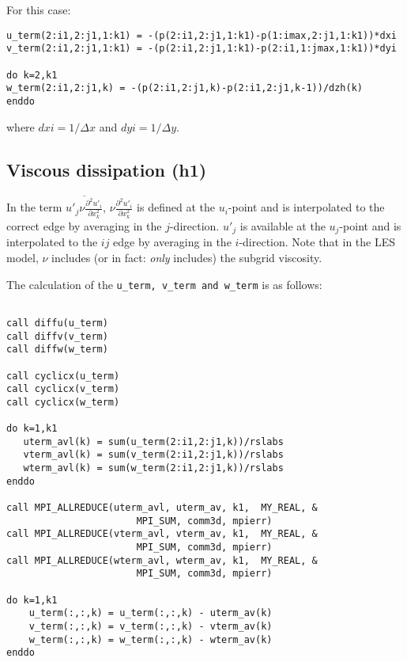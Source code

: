 \documentclass[10pt]{article}
\begin{document}
For this case:

\begin{verbatim}
u_term(2:i1,2:j1,1:k1) = -(p(2:i1,2:j1,1:k1)-p(1:imax,2:j1,1:k1))*dxi
v_term(2:i1,2:j1,1:k1) = -(p(2:i1,2:j1,1:k1)-p(2:i1,1:jmax,1:k1))*dyi

do k=2,k1
w_term(2:i1,2:j1,k) = -(p(2:i1,2:j1,k)-p(2:i1,2:j1,k-1))/dzh(k) 
enddo
\end{verbatim}

\noindent where $dxi=1/\Delta x$ and $dyi=1/\Delta y$.

\subsection{Viscous dissipation (h1)}
In the term $\overline{u'_j \nu \frac{\partial^2 u'_i}{\partial x^2_k}}$, $\nu \frac{\partial^2 u'_i}{\partial x^2_k}$ is 
defined at the $u_i$-point  and is interpolated to the correct edge by averaging in the $j$-direction. $u'_j$ 
is available at the $u_j$-point and is interpolated to the $ij$ edge by averaging in the $i$-direction.
Note that in the LES model, $\nu$ includes (or in fact: \emph{only} includes) the subgrid viscosity.

The calculation of the \verb=u_term, v_term and w_term= is as follows:

\begin{verbatim}

call diffu(u_term)
call diffv(v_term)
call diffw(w_term)

call cyclicx(u_term)
call cyclicx(v_term)
call cyclicx(w_term)

do k=1,k1
   uterm_avl(k) = sum(u_term(2:i1,2:j1,k))/rslabs
   vterm_avl(k) = sum(v_term(2:i1,2:j1,k))/rslabs
   wterm_avl(k) = sum(w_term(2:i1,2:j1,k))/rslabs
enddo

call MPI_ALLREDUCE(uterm_avl, uterm_av, k1,  MY_REAL, &
                       MPI_SUM, comm3d, mpierr)
call MPI_ALLREDUCE(vterm_avl, vterm_av, k1,  MY_REAL, &
                       MPI_SUM, comm3d, mpierr)
call MPI_ALLREDUCE(wterm_avl, wterm_av, k1,  MY_REAL, &
                       MPI_SUM, comm3d, mpierr)

do k=1,k1
    u_term(:,:,k) = u_term(:,:,k) - uterm_av(k)
    v_term(:,:,k) = v_term(:,:,k) - vterm_av(k)
    w_term(:,:,k) = w_term(:,:,k) - wterm_av(k)
enddo
\end{verbatim}
 


\end{document}
